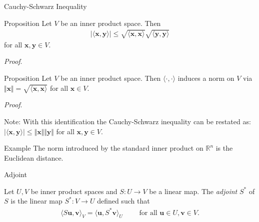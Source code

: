 \documentclass [aspectratio=169]{beamer}
\newcommand{\bu}{{\mathbf{u}}}
\newcommand{\bv}{{\mathbf{v}}}
\newcommand{\bx}{{\mathbf{x}}}
\newcommand{\by}{{\mathbf{y}}}
\newcommand{\innerprod}[1]{\langle #1 \rangle}
\newcommand{\R}{{\mathbb{R}}}
\begin{document}
\begin{frame}{Cauchy-Schwarz Inequality}
\begin{exampleblock}{Proposition}
Let $V$ be an inner product space. Then 
\begin{align*}
    \vert \innerprod{\bx,\by}\vert \leq \sqrt{\innerprod{\bx,\bx}}\sqrt{\innerprod{\by,\by}}
\end{align*}
for all $\bx,\by\in V$.
\end{exampleblock}
\end{frame}

\begin{frame}
\textit{Proof}.
\vspace{6.5cm}
\end{frame}


\begin{frame}
\begin{exampleblock}{Proposition}
Let $V$ be an inner product space. Then $\innerprod{\cdot,\cdot}$ induces a norm on $V$ via $\Vert \bx\Vert =\sqrt{\innerprod{\bx,\bx}} $ for all $\bx \in V$.
\end{exampleblock}
\textit{Proof}.
\vspace{4cm}
\end{frame}

\begin{frame}

\end{frame}

\begin{frame}
Note:
With this identification the Cauchy-Schwarz inequality can be restated as: $ \vert \innerprod{\bx,\by}\vert \leq \Vert \bx \Vert \Vert \by \Vert$ for all $\bx, \by\in V$.

\vspace{2em}

\begin{exampleblock}{Example}
The norm introduced by the standard inner product on $\R^n$ is the Euclidean distance. 
\end{exampleblock}
\end{frame}


\begin{frame}{Adjoint}
\begin{definition}
Let $U,V$ be inner product spaces and $S\colon U \to V$ be a linear map. The \emph{adjoint} $S^*$ of $S$ is the linear map $S^*\colon V \to U$ defined such that 
\begin{align*}
    \innerprod{S\bu,\bv}_V = \innerprod{\bu,S^*\bv}_U \qquad \text{ for all } \bu\in U, \bv\in V.
\end{align*}
\end{definition}
\end{frame}
\end{document}
